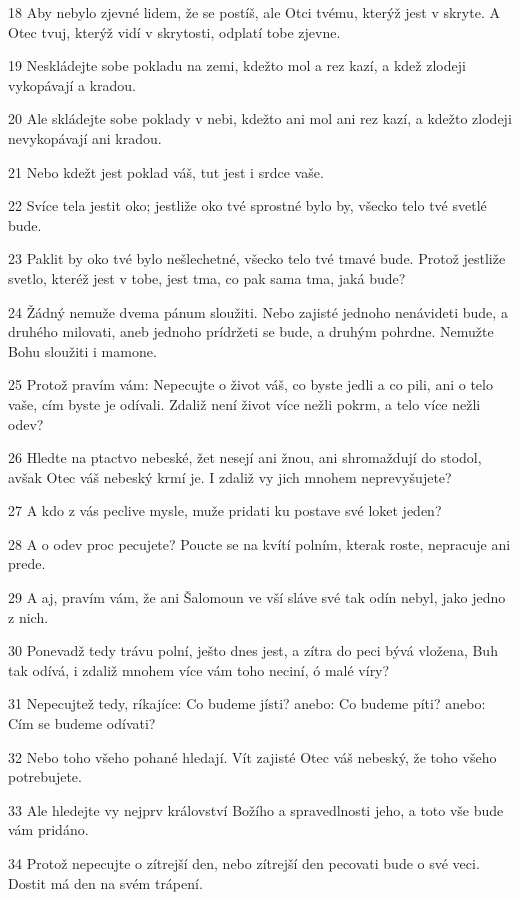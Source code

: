 \par 18 Aby nebylo zjevné lidem, že se postíš, ale Otci tvému, kterýž jest v skryte. A Otec tvuj, kterýž vidí v skrytosti, odplatí tobe zjevne.
\par 19 Neskládejte sobe pokladu na zemi, kdežto mol a rez kazí, a kdež zlodeji vykopávají a kradou.
\par 20 Ale skládejte sobe poklady v nebi, kdežto ani mol ani rez kazí, a kdežto zlodeji nevykopávají ani kradou.
\par 21 Nebo kdežt jest poklad váš, tut jest i srdce vaše.
\par 22 Svíce tela jestit oko; jestliže oko tvé sprostné bylo by, všecko telo tvé svetlé bude.
\par 23 Paklit by oko tvé bylo nešlechetné, všecko telo tvé tmavé bude. Protož jestliže svetlo, kteréž jest v tobe, jest tma, co pak sama tma, jaká bude?
\par 24 Žádný nemuže dvema pánum sloužiti. Nebo zajisté jednoho nenávideti bude, a druhého milovati, aneb jednoho prídržeti se bude, a druhým pohrdne. Nemužte Bohu sloužiti i mamone.
\par 25 Protož pravím vám: Nepecujte o život váš, co byste jedli a co pili, ani o telo vaše, cím byste je odívali. Zdaliž není život více nežli pokrm, a telo více nežli odev?
\par 26 Hledte na ptactvo nebeské, žet nesejí ani žnou, ani shromaždují do stodol, avšak Otec váš nebeský krmí je. I zdaliž vy jich mnohem neprevyšujete?
\par 27 A kdo z vás peclive mysle, muže pridati ku postave své loket jeden?
\par 28 A o odev proc pecujete? Poucte se na kvítí polním, kterak roste, nepracuje ani prede.
\par 29 A aj, pravím vám, že ani Šalomoun ve vší sláve své tak odín nebyl, jako jedno z nich.
\par 30 Ponevadž tedy trávu polní, ješto dnes jest, a zítra do peci bývá vložena, Buh tak odívá, i zdaliž mnohem více vám toho neciní, ó malé víry?
\par 31 Nepecujtež tedy, ríkajíce: Co budeme jísti? anebo: Co budeme píti? anebo: Cím se budeme odívati?
\par 32 Nebo toho všeho pohané hledají. Vít zajisté Otec váš nebeský, že toho všeho potrebujete.
\par 33 Ale hledejte vy nejprv království Božího a spravedlnosti jeho, a toto vše bude vám pridáno.
\par 34 Protož nepecujte o zítrejší den, nebo zítrejší den pecovati bude o své veci. Dostit má den na svém trápení.

